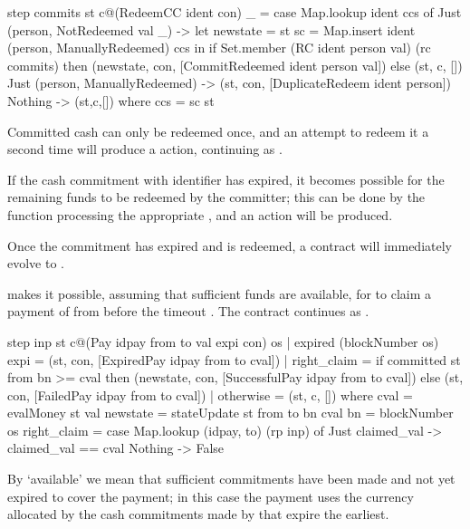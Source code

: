 \documentclass[runningheads]{llncs}
\begin{document}
\begin{haskellcode}
step commits st c@(RedeemCC ident con) _ =
    case Map.lookup ident ccs of
      Just (person, NotRedeemed val _) ->
        let newstate = 
                st {sc = Map.insert ident (person, ManuallyRedeemed) ccs} in
        if Set.member (RC ident person val) (rc commits)
        then (newstate, con, [CommitRedeemed ident person val])
        else (st, c, [])
      Just (person, ManuallyRedeemed) ->
        (st, con, [DuplicateRedeem ident person])
      Nothing -> (st,c,[])
    where
        ccs = sc st
\end{haskellcode}
Committed cash can only be redeemed once, and an attempt to redeem it a second time will produce a  
 action, continuing as .

If the cash commitment with identifier  has expired, it becomes possible for the remaining funds to 
be redeemed by the committer; this can be done by the  function processing the appropriate 
, and an  action will be produced. 

Once the commitment  has expired and is redeemed, a  contract will 
immediately evolve to .

\medskip
\noindent
{} makes it possible, assuming that sufficient funds are available, for 
 to claim  a payment of  from  before the timeout 
. The contract continues as . 

\begin{haskellcode}
step inp st c@(Pay idpay from to val expi con) os
  | expired (blockNumber os) expi = (st, con, [ExpiredPay idpay from to cval])
  | right_claim =
    if committed st from bn >= cval
      then (newstate, con, [SuccessfulPay idpay from to cval])
      else (st, con, [FailedPay idpay from to cval])
  | otherwise = (st, c, [])
  where
    cval = evalMoney st val
    newstate = stateUpdate st from to bn cval
    bn = blockNumber os
    right_claim =
      case Map.lookup (idpay, to) (rp inp) of
        Just claimed_val -> claimed_val == cval
        Nothing -> False
\end{haskellcode}
By `available' we mean that sufficient commitments have 
been made and  not yet expired to cover the payment; in this case the payment  uses the currency allocated by the cash 
commitments made by  that expire the earliest.
\end{document}
